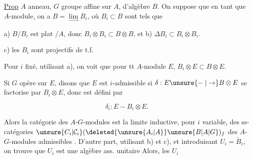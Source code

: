 
\uline{Prop} $A$ anneau, $G$ groupe affine sur $A$, d'algèbre $B$. On suppose que en tant que $A$-module, on a $B=\underset{\longrightarrow}{\lim} B_i$, où $B_i\subset B$ sont tels que

a) $B/B_i$ est plat /$A$,  donc \deleted{$\unsure{\Delta}$} $B_i\otimes B_i\subset B\otimes B$, et b) $\Delta B_i\subset B_i\otimes B_i$.

 c) les $B_i$ sont projectifs de t.f.

 Pour $i$ fixé, utilisant a), on voit que pour tt $A$-module $E$, $B_i\otimes E\subset B\otimes E$.

Si $G$ opère sur $E$, disons que $E$ est $i$-admissible si $\delta:E\unsure{\mathrel{-}|\to} B\otimes E$ se factorise par $B_i\otimes E$, donc est défini par

\[
\delta_i:E\mathrel{-} B_i\otimes E.
\]

Alors la catégorie des $A$-$G$-modules  est la limite inductive, pour $i$ variable, des ss-catégories $\unsure{C_i|\mathcal C_i}(\deleted{\unsure{A_i|A}}\unsure{B|A|G})_f$ des $A$-$G$-modules admissibles . D'autre part, utilisant b) et c), et introduisant $U_i=\check B_i$, on trouve que $U_i$ est une algèbre ass. unitaire
 \deleted{\unsure{non, si} $1\in \unsure{G|B}$ $i$ assez grand pour que $\unsure{\varepsilon}(B_i)=A$,\unsure{\}|]}} \deleted{\unsure{p. ex. pour} $1\in \unsure{B_i|E_i}$\unsure{]}} Alors, les  $U_i$
